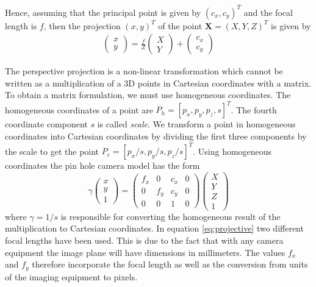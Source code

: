 \documentclass[11pt,a4paper]{report}
\begin{document}
Hence, assuming that the principal point is given by $(c_x,c_y)^T$ and the focal
length is $f$, then the projection $(x,y)^T$ of the point $\mathbf{X} = (X,Y,Z)^T$ is given by
\begin{align}\label{eq:pinCoord}
\begin{pmatrix}x\\y\end{pmatrix} = \frac{f}{Z}\begin{pmatrix}X\\Y\end{pmatrix} + \begin{pmatrix}c_x\\c_y\end{pmatrix}
\end{align}


The perspective projection is a non-linear transformation which cannot be written
as a multiplication of a 3D points in Cartesian coordinates with a matrix. To obtain a matrix formulation, we must
use homogeneous coordinates. The homogeneous coordinates of a point are $P_h =
[p_x,p_y,p_z,s]^T$. The fourth coordinate component $s$ is called
\textit{scale}. We transform a point in homogeneous coordinates into Cartesian
coordinates by dividing the first three components by the scale to get the point
$P_c = [p_x/s, p_y/s, p_z/s]^T$. Using homogeneous coordinates the pin hole
camera model has the form
\begin{equation}\label{eq:projective}
\gamma\begin{pmatrix}x\\y\\1\end{pmatrix}
= \begin{pmatrix}f_x&0&c_x&0\\0&f_y&c_y&0\\0&0&1&0\end{pmatrix} \begin{pmatrix}X\\Y\\Z\\1\end{pmatrix}
\end{equation}
where $\gamma = 1/s$ is responsible for converting the homogeneous result of the
multiplication to Cartesian coordinates. In equation \ref{eq:projective} two
different focal lengths have been used. This is due to the fact that with any
camera equipment the image plane will have dimensions in millimeters. The values
$f_x$ and $f_y$ therefore incorporate the focal length as well as the conversion
from units of the imaging equipment to pixels.
\end{document}
